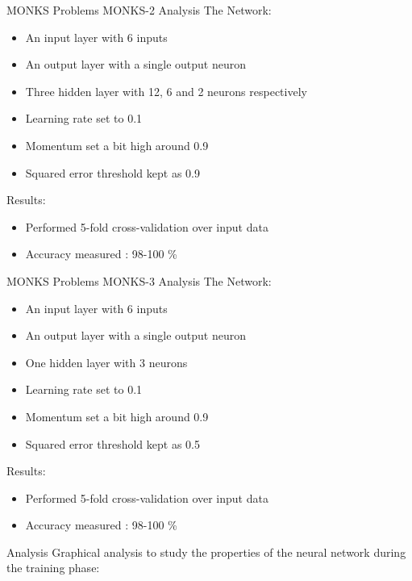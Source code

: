 \documentclass{beamer}
\begin{document}
\begin{frame}{MONKS Problems}
MONKS-2 Analysis\newline
The Network:
\begin{itemize}
	\item An input layer with 6 inputs
    \item An output layer with a single output neuron
    \item Three hidden layer with 12, 6 and 2 neurons respectively
    \item Learning rate set to 0.1
    \item Momentum set a bit high around 0.9
    \item Squared error threshold kept as 0.9
    \newline 
\end{itemize}
Results:
\begin{itemize}
	\item Performed 5-fold cross-validation over input data
    \item Accuracy measured : 98-100 \%    
\end{itemize}

\end{frame}
\begin{frame}{MONKS Problems}
MONKS-3 Analysis\newline
The Network:
\begin{itemize}
	\item An input layer with 6 inputs
    \item An output layer with a single output neuron
    \item One hidden layer with 3 neurons
    \item Learning rate set to 0.1
    \item Momentum set a bit high around 0.9
    \item Squared error threshold kept as 0.5
    \newline 
\end{itemize}
Results:
\begin{itemize}
	\item Performed 5-fold cross-validation over input data
    \item Accuracy measured : 98-100 \%    
\end{itemize}

\end{frame}

\begin{frame}{Analysis}
Graphical analysis to study the properties of the neural network during the training phase:

\end{frame}



\vskip 1cm

\end{document}
